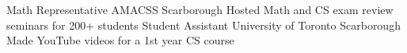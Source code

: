 \begin{cvhonors}
  \cvhonor
    {Math Representative}
    {AMACSS}
    {Scarborough}
    {}
    {Hosted Math and CS exam review seminars for 200+ students}
  \cvhonor
    {Student Assistant}
    {University of Toronto}
    {Scarborough}
    {}
    {Made YouTube videos for a 1st year CS course}
\end{cvhonors}